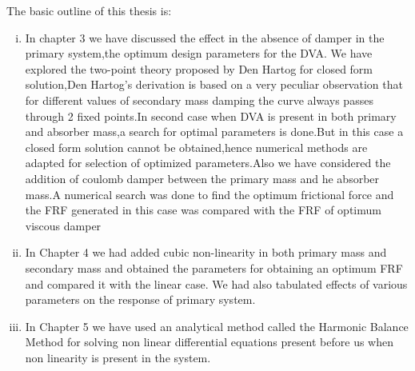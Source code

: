 The basic outline of this thesis is:
\begin{enumerate}[i)]
\item In chapter 3 we have discussed the effect in the absence of damper in the primary system,the optimum design parameters for the DVA. We have explored the two-point theory proposed by Den Hartog for closed form solution,Den Hartog’s derivation is based on a very peculiar observation that for different values of secondary mass damping the curve always passes through 2 fixed points.In second case when DVA is present in both primary and absorber mass,a search for optimal parameters is done.But in this case a closed form solution cannot be obtained,hence numerical methods are adapted for selection of optimized parameters.Also we have considered the addition of coulomb damper between the primary mass and he absorber mass.A numerical search was done to find the optimum frictional force and the FRF generated in this case was compared with the FRF of optimum viscous damper 

\item In Chapter 4 we had added cubic non-linearity in both primary mass and secondary mass and obtained the parameters for obtaining an optimum FRF and compared it with the linear case. We had also tabulated effects of various parameters on the response of primary system.

\item In Chapter 5 we have used an analytical method called the Harmonic Balance Method for solving non linear differential equations present before us when non linearity is present in the system.   
\end{enumerate}

%
                       
